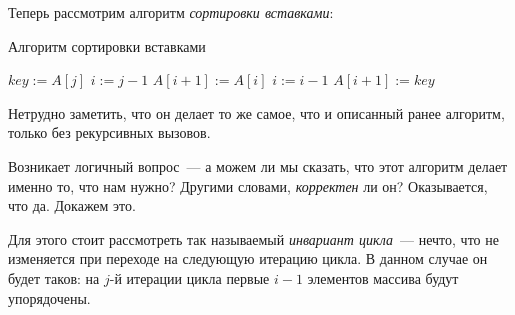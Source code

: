 Теперь рассмотрим алгоритм \emph{сортировки вставками}:

\begin{algorithm}[H]
	\caption{Алгоритм сортировки вставками}
	\begin{algorithmic}[1]
			\State \(key \mathrel{:=} A[j]\)
			\State \(i \mathrel{:=} j - 1\)
				\State \(A[i + 1] \mathrel{:=} A[i]\)
				\State \(i \mathrel{:=} i - 1\)
			\EndWhile
			\State \(A[i + 1] \mathrel{:=} key\)
		\EndFor
		\EndFunction
	\end{algorithmic}
\end{algorithm}

Нетрудно заметить, что он делает то же самое, что и описанный ранее алгоритм, только без рекурсивных вызовов.

Возникает логичный вопрос~--- а можем ли мы сказать, что этот алгоритм делает именно то, что нам нужно? Другими словами, \emph{корректен} ли он? Оказывается, что да. Докажем это.

Для этого стоит рассмотреть так называемый \emph{инвариант цикла}~--- нечто, что не изменяется при переходе на следующую итерацию цикла. В данном случае он будет таков: на \(j\)-й итерации цикла первые \(i - 1\) элементов массива будут упорядочены.

